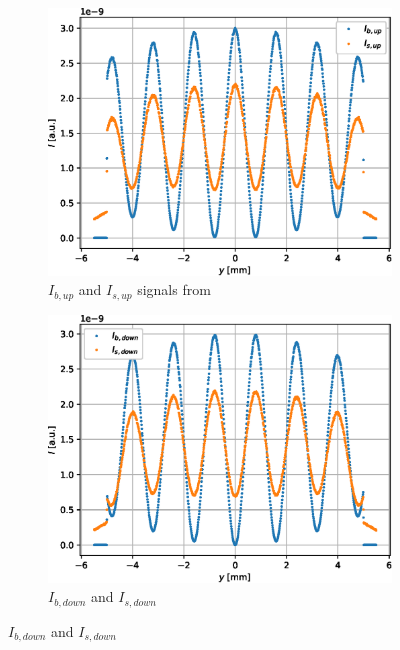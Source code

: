 \documentclass{article}
\begin{document}
\begin{figure}[htbp]
	\centering
	\begin{subfigure}[b]{0.45\textwidth}
		\centering
		\includegraphics[width=\textwidth]{simulation-raw-intensity-up}
		\caption{$I_{b,up}$ and $I_{s,up}$ signals from }
		\label{fig:simulation-raw-intensity-up}
	\end{subfigure}
	\hfill
	\begin{subfigure}[b]{0.45\textwidth}
		\centering
		\includegraphics[width=\textwidth]{simulation-raw-intensity-down}
		\caption{$I_{b,down}$ and $I_{s,down}$}
		\label{fig:simulation-raw-intensity-down}
	\end{subfigure}

\end{figure}
\end{document}
